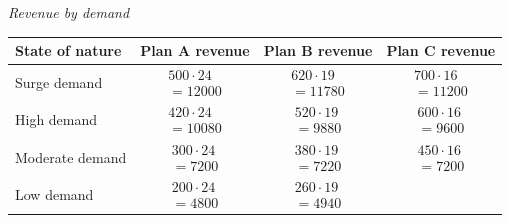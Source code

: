 \begin{ExamProblems}
\begin{center}
				\textit{Revenue by demand} \\
				\begin{tabular}{l c c c}
					\toprule
					State of nature & Plan A revenue & Plan B revenue & Plan C revenue \\
					\midrule
					Surge demand &
					$\begin{array}{l}
						500\cdot 24\\
						= 12000
					\end{array}$ &
					$\begin{array}{l}
						620\cdot 19\\
						= 11780
					\end{array}$ &
					$\begin{array}{l}
						700\cdot 16\\
						= 11200
					\end{array}$ \\
					High demand &
					$\begin{array}{l}
						420\cdot 24\\
						= 10080
					\end{array}$ &
					$\begin{array}{l}
						520\cdot 19\\
						= 9880
					\end{array}$ &
					$\begin{array}{l}
						600\cdot 16\\
						= 9600
					\end{array}$ \\
					Moderate demand &
					$\begin{array}{l}
						300\cdot 24\\
						= 7200
					\end{array}$ &
					$\begin{array}{l}
						380\cdot 19\\
						= 7220
					\end{array}$ &
					$\begin{array}{l}
						450\cdot 16\\
						= 7200
					\end{array}$ \\
					Low demand &
					$\begin{array}{l}
						200\cdot 24\\
						= 4800
					\end{array}$ &
					$\begin{array}{l}
						260\cdot 19\\
						= 4940
					\end{array}$ &

\end{tabular}
\end{center}
\end{ExamProblems}

